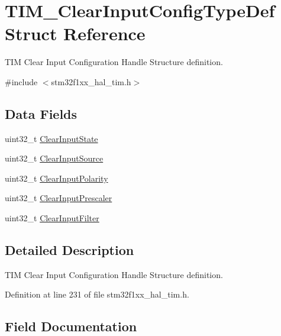\hypertarget{struct_t_i_m___clear_input_config_type_def}{}\section{T\+I\+M\+\_\+\+Clear\+Input\+Config\+Type\+Def Struct Reference}
\label{struct_t_i_m___clear_input_config_type_def}


T\+IM Clear Input Configuration Handle Structure definition.  




{\ttfamily \#include $<$stm32f1xx\+\_\+hal\+\_\+tim.\+h$>$}

\subsection*{Data Fields}
\begin{DoxyCompactItemize}
\item 
uint32\+\_\+t \hyperlink{struct_t_i_m___clear_input_config_type_def_ae375822fd9a07ebafaf13fc47db211db}{Clear\+Input\+State}
\item 
uint32\+\_\+t \hyperlink{struct_t_i_m___clear_input_config_type_def_a53908db365bf0aa50a9217dcee98b61c}{Clear\+Input\+Source}
\item 
uint32\+\_\+t \hyperlink{struct_t_i_m___clear_input_config_type_def_a952f89c595fc06fe7e0ad41f8992fda2}{Clear\+Input\+Polarity}
\item 
uint32\+\_\+t \hyperlink{struct_t_i_m___clear_input_config_type_def_a177e485feed1a56dbb578aa11f758c79}{Clear\+Input\+Prescaler}
\item 
uint32\+\_\+t \hyperlink{struct_t_i_m___clear_input_config_type_def_a79dfd4545a2fa8ca202bf0e80374db66}{Clear\+Input\+Filter}
\end{DoxyCompactItemize}


\subsection{Detailed Description}
T\+IM Clear Input Configuration Handle Structure definition. 

Definition at line 231 of file stm32f1xx\+\_\+hal\+\_\+tim.\+h.



\subsection{Field Documentation}
\mbox{\label{struct_t_i_m___clear_input_config_type_def_a79dfd4545a2fa8ca202bf0e80374db66}} 
